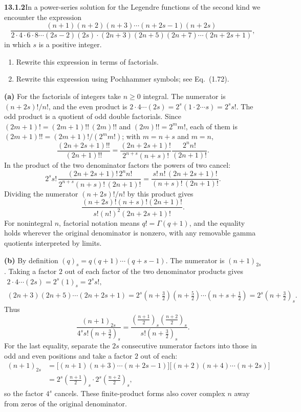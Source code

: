 \par\bigskip
\noindent\textbf{13.1.2}\quad In a power-series solution for the Legendre
functions of the second kind we encounter the expression
\[
\frac{(n+1)(n+2)(n+3)\cdots(n+2s-1)(n+2s)}
{2\cdot4\cdot6\cdot8\cdots(2s-2)(2s)\cdot(2n+3)(2n+5)(2n+7)\cdots(2n+2s+1)},
\]
in which $s$ is a positive integer.
\begin{enumerate}
\item[(a)] Rewrite this expression in terms of factorials.
\item[(b)] Rewrite this expression using Pochhammer symbols; see Eq.~(1.72).
\end{enumerate}
\solution
\textbf{(a)} For the factorials of integers take $n\ge0$ integral.
The numerator is $(n+2s)!/n!$, and the even product is
$2\cdot4\cdots(2s)=2^s(1\cdot2\cdots s)=2^ss!$.  The odd product is a
quotient of odd double factorials.  Since $(2m+1)!=(2m+1)!!\,(2m)!!$
and $(2m)!!=2^mm!$, each of them is $(2m+1)!!=(2m+1)!/(2^mm!)$; with
$m=n+s$ and $m=n$,
\[
\frac{(2n+2s+1)!!}{(2n+1)!!}
=\frac{(2n+2s+1)!}{2^{n+s}(n+s)!}
 \frac{2^nn!}{(2n+1)!}.
\]
In the product of the two denominator factors the powers of two
cancel:
\[
2^ss!\,\frac{(2n+2s+1)!\,2^nn!}{2^{n+s}(n+s)!\,(2n+1)!}
=\frac{s!\,n!\,(2n+2s+1)!}{(n+s)!\,(2n+1)!}.
\]
Dividing the numerator $(n+2s)!/n!$ by this product gives
\[
\boxed{\frac{(n+2s)!(n+s)!(2n+1)!}
{s!(n!)^2(2n+2s+1)!}}.
\]
For nonintegral $n$, factorial notation means $q!=\Gamma(q+1)$,
and the equality holds wherever the original denominator is nonzero,
with any removable gamma quotients interpreted by limits.

\textbf{(b)} By definition $(q)_s=q(q+1)\cdots(q+s-1)$.
The numerator is $(n+1)_{2s}$.  Taking a factor $2$ out of each
factor of the two denominator products gives
\begin{gather*}
2\cdot4\cdots(2s)=2^s(1)_s=2^ss!,\\
(2n+3)(2n+5)\cdots(2n+2s+1)
=2^s\left(n+\tfrac32\right)\left(n+\tfrac52\right)\cdots
\left(n+s+\tfrac12\right)
=2^s\left(n+\tfrac32\right)_s.
\end{gather*}
Thus
\[
\boxed{\frac{(n+1)_{2s}}{4^s s!(n+\tfrac32)_s}
=\frac{(\tfrac{n+1}{2})_s(\tfrac{n+2}{2})_s}
{s!(n+\tfrac32)_s}}.
\]
For the last equality, separate the $2s$ consecutive numerator
factors into those in odd and even positions and take a factor $2$
out of each:
\begin{align*}
(n+1)_{2s}&=\bigl[(n+1)(n+3)\cdots(n+2s-1)\bigr]
 \bigl[(n+2)(n+4)\cdots(n+2s)\bigr]\\
&=2^s\left(\tfrac{n+1}2\right)_s\cdot2^s\left(\tfrac{n+2}2\right)_s,
\end{align*}
so the factor $4^s$ cancels.  These finite-product forms also cover
complex $n$ away from zeros of the original denominator.


